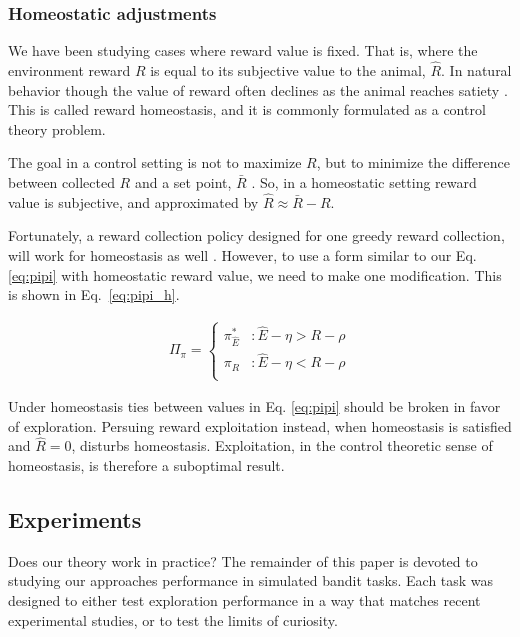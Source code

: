 \subsubsection*{Homeostatic adjustments}
We have been studying cases where reward value is fixed. That is, where the environment reward $R$ is equal to its subjective value to the animal, $\hat R$. In natural behavior though the value of reward often declines as the animal reaches satiety \cite{Keramati2014,Juechems2019,Munch2020}. This is called reward homeostasis, and it is commonly formulated as a control theory problem.

The goal in a control setting is not to maximize $R$, but to minimize the difference between collected $R$ and a set point, $\bar R$ \cite{Keramati2014,Juechems2019,Munch2020}. So, in a homeostatic setting reward value is subjective, and approximated by $\hat R \approx \bar R - R$.

Fortunately, a reward collection policy designed for one greedy reward collection, will work for homeostasis as well \cite{Keramati2014}. However, to use a form similar to our Eq. \ref{eq:pipi} with homeostatic reward value, we need to make one modification. This is shown in Eq.~\ref{eq:pipi_h}. 

\begin{equation} 
    \label{eq:pipi_h}
    \begin{split}
        \Pi_{\pi} = 
        \begin{cases}
            \pi^*_{\hat{E}} & : \hat{E} - \eta > R - \rho \\
            \pi_R 	& : \hat{E} - \eta < R - \rho \\
        \end{cases}
    \end{split}
\end{equation}

Under homeostasis ties between values in Eq. \ref{eq:pipi} should be broken in favor of exploration. Persuing reward exploitation instead, when homeostasis is satisfied and $\hat R=0$, disturbs homeostasis. Exploitation, in the control theoretic sense of homeostasis, is therefore a suboptimal result. 

\subsection*{Experiments}
Does our theory work in practice? The remainder of this paper is devoted to studying our approaches performance in simulated bandit tasks. Each task was designed to either test exploration performance in a way that matches recent experimental studies, or to test the limits of curiosity. 

